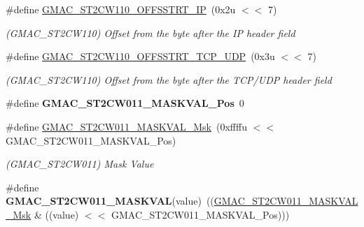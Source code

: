 \begin{DoxyCompactItemize}
\mbox{\label{group__SAMV71__GMAC_gaa65a1dac267299505f62a0d4498c09d4}} 
\#define \mbox{\hyperlink{group__SAMV71__GMAC_gaa65a1dac267299505f62a0d4498c09d4}{G\+M\+A\+C\+\_\+\+S\+T2\+C\+W110\+\_\+\+O\+F\+F\+S\+S\+T\+R\+T\+\_\+\+IP}}~(0x2u $<$$<$ 7)
\begin{DoxyCompactList}\small\item\em (G\+M\+A\+C\+\_\+\+S\+T2\+C\+W110) Offset from the byte after the IP header field \end{DoxyCompactList}\item 
\mbox{\label{group__SAMV71__GMAC_ga84b15ba8b81892462e2576eb354532b2}} 
\#define \mbox{\hyperlink{group__SAMV71__GMAC_ga84b15ba8b81892462e2576eb354532b2}{G\+M\+A\+C\+\_\+\+S\+T2\+C\+W110\+\_\+\+O\+F\+F\+S\+S\+T\+R\+T\+\_\+\+T\+C\+P\+\_\+\+U\+DP}}~(0x3u $<$$<$ 7)
\begin{DoxyCompactList}\small\item\em (G\+M\+A\+C\+\_\+\+S\+T2\+C\+W110) Offset from the byte after the T\+C\+P/\+U\+DP header field \end{DoxyCompactList}\item 
\mbox{\label{group__SAMV71__GMAC_ga57dd3758d48f9cfc7ef84145bd6884de}} 
\#define {\bfseries G\+M\+A\+C\+\_\+\+S\+T2\+C\+W011\+\_\+\+M\+A\+S\+K\+V\+A\+L\+\_\+\+Pos}~0
\item 
\mbox{\label{group__SAMV71__GMAC_ga90086e7296564e8a03d30295e089b56d}} 
\#define \mbox{\hyperlink{group__SAMV71__GMAC_ga90086e7296564e8a03d30295e089b56d}{G\+M\+A\+C\+\_\+\+S\+T2\+C\+W011\+\_\+\+M\+A\+S\+K\+V\+A\+L\+\_\+\+Msk}}~(0xffffu $<$$<$ G\+M\+A\+C\+\_\+\+S\+T2\+C\+W011\+\_\+\+M\+A\+S\+K\+V\+A\+L\+\_\+\+Pos)
\begin{DoxyCompactList}\small\item\em (G\+M\+A\+C\+\_\+\+S\+T2\+C\+W011) Mask Value \end{DoxyCompactList}\item 
\mbox{\label{group__SAMV71__GMAC_ga2518ce263a7e4cb2842ec4fadc87bbc2}} 
\#define {\bfseries G\+M\+A\+C\+\_\+\+S\+T2\+C\+W011\+\_\+\+M\+A\+S\+K\+V\+AL}(value)~((\mbox{\hyperlink{group__SAMV71__GMAC_ga90086e7296564e8a03d30295e089b56d}{G\+M\+A\+C\+\_\+\+S\+T2\+C\+W011\+\_\+\+M\+A\+S\+K\+V\+A\+L\+\_\+\+Msk}} \& ((value) $<$$<$ G\+M\+A\+C\+\_\+\+S\+T2\+C\+W011\+\_\+\+M\+A\+S\+K\+V\+A\+L\+\_\+\+Pos)))

\end{DoxyCompactItemize}
